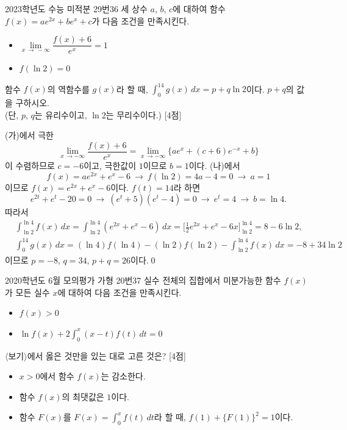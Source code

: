 \documentclass{article}
\begin{document}
\newpage
\begin{prob}{2023학년도 수능 미적분 29번}{36}
	세 상수 $a$, $b$, $c$에 대하여 함수 $f(x)=ae^{2x}+be^x+c$가 다음 조건을 만족시킨다.
	\begin{hint}
		\begin{itemize}
			\item[(가)] $\lim\limits_{x\,\to\,-\infty}\dfrac{f(x)+6}{e^x}=1$
			\item[(나)] $f(\ln 2)=0$
		\end{itemize}
	\end{hint}
	함수 $f(x)$의 역함수를 $g(x)$라 할 때, $\displaystyle\int_0^{14}g(x)\,dx=p+q\ln2$이다. $p+q$의 값을 구하시오. \\ (단, $p$, $q$는 유리수이고, $\ln 2$는 무리수이다.) [4점]
\end{prob}

\begin{sol}
	(가)에서 극한
	\[
		\lim\limits_{x\,\to-\infty}\dfrac{f(x)+6}{e^x}=\lim\limits_{x\,\to-\infty}\{ae^x+(c+6)e^{-x}+b\}
	\]
	이 수렴하므로 $c=-6$이고, 극한값이 $1$이므로 $b=1$이다. (나)에서
	\[
		f(x)=ae^{2x}+e^x-6~\longrightarrow~f(\ln2)=4a-4=0~\longrightarrow~a=1
	\]
	이므로 $f(x)=e^{2x}+e^x-6$이다. $f(t)=14$라 하면
	\[
		e^{2t}+e^t-20=0~\longrightarrow~(e^t+5)(e^t-4)=0~\longrightarrow~e^t=4~\longrightarrow~b=\ln4.
	\]
	따라서
	\[
		\begin{aligned}
			&\int_{\ln2}^{\ln4}f(x)\,dx=\int_{\ln2}^{\ln4}(e^{2x}+e^x-6)\,dx=\biggl[\frac{1}{2}e^{2x}+e^x-6x\biggr]_{\ln2}^{\ln4}=8-6\ln2,\\[3pt]
			&\int_0^{14}g(x)\,dx=(\ln4)f(\ln4)-(\ln2)f(\ln2)-\int_{\ln2}^{\ln4}f(x)\,dx=-8+34\ln2
		\end{aligned}
	\]
	이므로 $p=-8$, $q=34$, $p+q=26$이다.\qed
\end{sol}

\newpage
\begin{prob}{2020학년도 6월 모의평가 가형 20번}{37}
	실수 전체의 집합에서 미분가능한 함수 $f(x)$가 모든 실수 $x$에 대하여 다음 조건을 만족시킨다.
	\begin{hint}
		\begin{itemize}
			\item[(가)] $f(x)>0$
			\item[(나)] $\ln f(x)+2\displaystyle\int_0^x(x-t)f(t)\,dt=0$
		\end{itemize}
	\end{hint}
	$\langle$보기$\rangle$에서 옳은 것만을 있는 대로 고른 것은? [4점]
	\begin{hint}[보기]
		\begin{itemize}
			\item[ㄱ.] $x>0$에서 함수 $f(x)$는 감소한다.
			\item[ㄴ.] 함수 $f(x)$의 최댓값은 $1$이다.
			\item[ㄷ.] 함수 $F(x)$를 $F(x)=\displaystyle\int_0^xf(t)\,dt$라 할 때, $f(1)+\{F(1)\}^2=1$이다.
		\end{itemize}
	\end{hint}
\end{prob}
\end{document}
